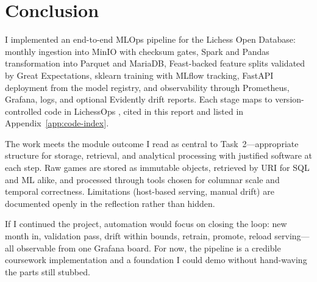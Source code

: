 \section{Conclusion}
\label{sec:conclusion}

I implemented an end-to-end MLOps pipeline for the Lichess Open Database: monthly ingestion into MinIO with checksum gates, Spark and Pandas transformation into Parquet and MariaDB, Feast-backed feature splits validated by Great Expectations, sklearn training with MLflow tracking, FastAPI deployment from the model registry, and observability through Prometheus, Grafana, logs, and optional Evidently drift reports. Each stage maps to version-controlled code in LichessOps , cited in this report and listed in Appendix~\ref{app:code-index}.

The work meets the module outcome I read as central to Task~2---appropriate structure for storage, retrieval, and analytical processing with justified software at each step. Raw games are stored as immutable objects, retrieved by URI for SQL and ML alike, and processed through tools chosen for columnar scale and temporal correctness. Limitations (host-based serving, manual drift) are documented openly in the reflection rather than hidden.

If I continued the project, automation would focus on closing the loop: new month in, validation pass, drift within bounds, retrain, promote, reload serving---all observable from one Grafana board. For now, the pipeline is a credible coursework implementation and a foundation I could demo without hand-waving the parts still stubbed.
